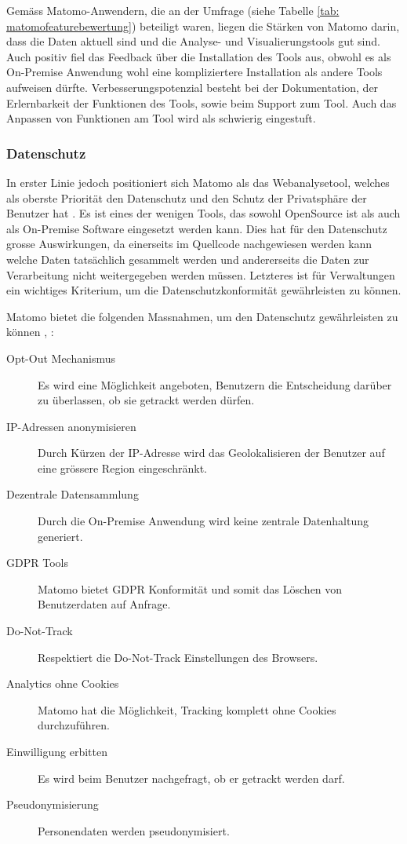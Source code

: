 Gemäss Matomo-Anwendern, die an der Umfrage (siehe Tabelle \ref{tab: matomofeaturebewertung}) beteiligt waren, liegen die Stärken von Matomo darin, dass die Daten aktuell sind und die Analyse- und Visualierungstools gut sind. 
Auch positiv fiel das Feedback über die Installation des Tools aus, obwohl es als On-Premise Anwendung wohl eine kompliziertere Installation als andere Tools aufweisen dürfte.
Verbesserungspotenzial besteht bei der Dokumentation, der Erlernbarkeit der Funktionen des Tools, sowie beim Support zum Tool. Auch das Anpassen von Funktionen am Tool wird als schwierig eingestuft.

\subsubsection{Datenschutz}
In erster Linie jedoch positioniert sich Matomo als das Webanalysetool, welches als oberste Priorität den Datenschutz und den Schutz der Privatsphäre der Benutzer hat \parencite{MamotoPrivacy}. Es ist eines der wenigen Tools, das sowohl OpenSource ist als auch als On-Premise Software eingesetzt werden kann. Dies hat für den Datenschutz grosse Auswirkungen, da einerseits im Quellcode nachgewiesen werden kann welche Daten tatsächlich gesammelt werden und andererseits die Daten zur Verarbeitung nicht weitergegeben werden müssen. Letzteres ist für Verwaltungen ein wichtiges Kriterium, um die Datenschutzkonformität gewährleisten zu können.

Matomo bietet die folgenden Massnahmen, um den Datenschutz gewährleisten zu können \parencite{MamotoFeatures}, \parencite{MamotoPrivacy}:

\begin{description}
  \item[Opt-Out Mechanismus] Es wird eine Möglichkeit angeboten, Benutzern die Entscheidung darüber zu überlassen, ob sie getrackt werden dürfen.
  \item[IP-Adressen anonymisieren] Durch Kürzen der IP-Adresse wird das Geolokalisieren der Benutzer auf eine grössere Region eingeschränkt.
  \item[Dezentrale Datensammlung] Durch die On-Premise  Anwendung wird keine zentrale Datenhaltung generiert.
  \item[GDPR Tools] Matomo bietet GDPR Konformität und somit das Löschen von Benutzerdaten auf Anfrage.  
  \item[Do-Not-Track] Respektiert die Do-Not-Track Einstellungen des Browsers.
  \item[Analytics ohne Cookies] Matomo hat die Möglichkeit, Tracking komplett ohne Cookies durchzuführen.
  \item[Einwilligung erbitten] Es wird beim Benutzer nachgefragt, ob er getrackt werden darf.
  \item[Pseudonymisierung] Personendaten werden pseudonymisiert.  
\end{description}

